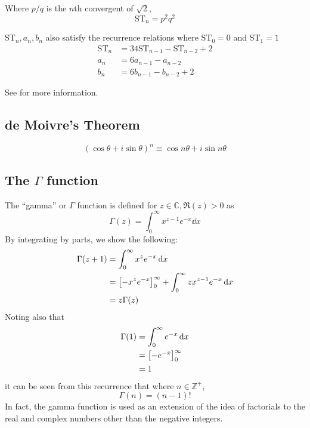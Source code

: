 \documentclass[fleqn,a4paper,11pt]{article}
\newcommand{\setstyle}{\mathbb}
\newcommand{\Integers}{\setstyle Z}
\newcommand{\Complex}{\setstyle C}
\begin{document}

    Where \(p / q\) is the \(n\)th convergent of \(\sqrt 2\),
    \begin{equation}
    \mathrm{ST}_n = p^2 q^2
    \end{equation}

    \(\mathrm{ST}_n, a_n, b_n\) also satisfy the recurrence relations where
    \(\mathrm{ST}_0 = 0\) and \(\mathrm{ST}_1 = 1\)
    \begin{align}
    \mathrm{ST}_n &= 34\mathrm{ST}_{n - 1} - \mathrm{ST}_{n - 2} + 2\\
    a_n &= 6a_{n - 1} - a_{n - 2} \\
    b_n &= 6b_{n - 1} - b_{n - 2} + 2
    \end{align}

    See \cite{WikiSTNumbers,WolframSTNumbers} for more information.

    \subsection{de Moivre's Theorem}

    \begin{equation}
    (\cos \theta + i \sin \theta)^n \equiv \cos n\theta + i \sin n\theta
    \end{equation}

    \subsection[The \(\Gamma\) function]
               {The \boldmath\(\Gamma\) function}

    The ``gamma'' or \(\Gamma\) function is defined for
    \(z \in \Complex, \Re(z) > 0\) as
    \begin{equation}
    \Gamma(z) = \int_0^{\infty} x^{z - 1}e^{-x} \dd{x}
    \end{equation}
    By integrating by parts, we show the following:
    \begin{align*}
    \Gamma(z + 1) &= \int_0^\infty x^{z}e^{-x} \dd{x} \\
                  &= \bqty{-x^{z} e^{-x}}_0^\infty
                     + \int_0^\infty zx^{z - 1}e^{-x} \dd{x} \\
                  &= z\Gamma(z)
    \end{align*}
    Noting also that
    \begin{align*}
    \Gamma(1) &= \int_0^\infty e^{-x} \dd{x} \\
              &= \bqty{-e^{-x}}_0^\infty \\
              &= 1
    \end{align*}
    it can be seen from this recurrence that where \(n \in \Integers^+\),
    \begin{equation}
    \Gamma(n) = (n - 1)!
    \end{equation}
    In fact, the gamma function is used as an extension of the idea of
    factorials to the real and complex numbers other than the negative integers.
\end{document}
